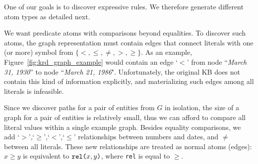 %

One of our goals is to discover expressive rules. We therefore generate different atom types as detailed next.

\noindent {}
We want predicate atoms with comparisons beyond equalities.
To discover such atoms, the graph representation must contain edges that connect literals with one (or more) symbol from $\{<,\leq,\neq,>,\geq\}$. As an example, Figure~\ref{fig:krd_graph_example} would contain an edge `$<$' from node ``\textit{March 31, 1930}'' to node ``\textit{March 21, 1986}". Unfortunately, the original KB does not contain this kind of information explicitly, and materializing such edges among all literals is infeasible.

Since we discover paths for a pair of entities from $G$ in isolation, the size of a graph for a pair of entities is relatively small, thus we can afford to compare all literal values within a single example graph. 
Besides equality comparisons, we add `$>$',`$\geq$',`$<$',`$\leq$' relationships between numbers and dates, and $\neq$ between all literals. These new relationships are treated as normal atoms (edges): $x \geq y$ is equivalent to $\texttt{rel(}x,y\texttt{)}$, where \texttt{rel} is equal to $\geq$. 

